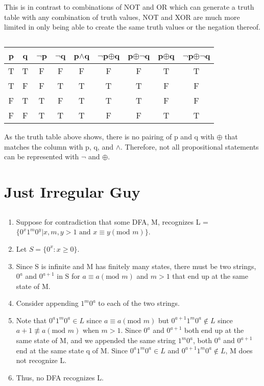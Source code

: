 \documentclass[11pt]{article}
\begin{document}
This is in contrast to combinations of NOT and OR which can generate a truth table with any combination of truth values, NOT and XOR are much more limited in only being able to create the same truth values or the negation thereof. 

\subsection{} %
\begin{center}
\begin{tabular}{ c|c|c|c|c|c|c|c|c } 
	p & q & $\neg$p & $\neg$q & p$\land$q & $\neg$p$\oplus$q & p$\oplus \neg$q & p$\oplus$q & $\neg$p$\oplus \neg$q \\
	\hline
	T & T & F & F & F & F & F & T & T \\
	T & F & F & T & T & T & T & F & F \\
	F & T & T & F & T & T & T & F & F \\
	F & F & T & T & T & F & F & T & T \\
\end{tabular}
\end{center}
As the truth table above shows, there is no pairing of p and q with $\oplus$ that matches the column with p, q, and $\land$. Therefore, not all propositional statements can be represented with $\neg$ and $\oplus$. 

\section{Just Irregular Guy} %
\subsection{} %
\begin{enumerate}
	\item Suppose for contradiction that some DFA, M, recognizes L = $\{0^x1^m0^y|x,m,y>1 \text{ and } x\equiv y(\text{mod } m)\}$.
	\item Let $S=\{0^x:x\geq 0\}$.
	\item Since S is infinite and M has finitely many states, there must be two strings, $0^a$ and $0^{a+1}$ in S for $a \equiv a (\text{mod }m)$ and $m > 1$ that end up at the same state of M. 
	\item Consider appending $1^m0^a$ to each of the two strings. 
	\item Note that $0^a1^m0^a \in L$ since $a \equiv a (\text{mod }m)$ but $0^{a+1}1^m0^a \notin L$ since $a+1 \not\equiv a (\text{mod }m)$ when $m>1$. Since $0^a$ and $0^{a+1}$ both end up at the same state of M, and we appended the same string $1^m0^a$, both $0^a$ and $0^{a+1}$ end at the same state q of M. Since $0^a1^m0^a \in L$ and $0^{a+1}1^m0^a \notin L$, M does not recognize L. 
	\item Thus, no DFA recognizes L. 
\end{enumerate}
\end{document}
